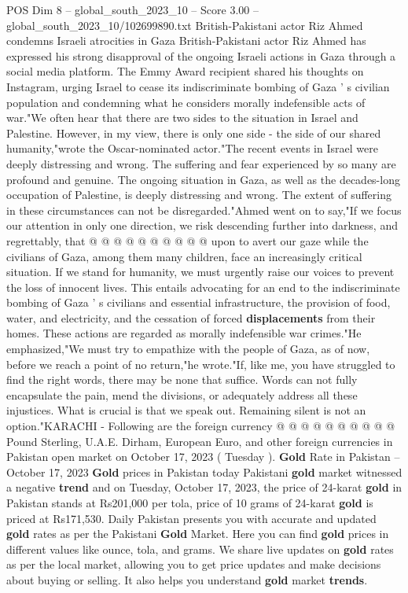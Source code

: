 \begin{textsample}{POS Dim 8 – global\_south\_2023\_10 – Score 3.00 – global\_south\_2023\_10/102699890.txt}  \label{ex:f8_pos_358}
British-Pakistani actor Riz Ahmed condemns Israeli atrocities in Gaza British-Pakistani actor Riz Ahmed has expressed his strong disapproval of the ongoing Israeli actions in Gaza through a social media platform.
The Emmy Award recipient shared his thoughts on Instagram, urging Israel to cease its indiscriminate bombing of Gaza ' s civilian population and condemning what he considers morally indefensible acts of war."We often hear that there are two sides to the situation in Israel and Palestine.
However, in my view, there is only one side - the side of our shared humanity,"wrote the Oscar-nominated actor."The recent events in Israel were deeply distressing and wrong.
The suffering and fear experienced by so many are profound and genuine.
The ongoing situation in Gaza, as well as the decades-long occupation of Palestine, is deeply distressing and wrong.
The extent of suffering in these circumstances can not be disregarded."Ahmed went on to say,"If we focus our attention in only one direction, we risk descending further into darkness, and regrettably, that @ @ @ @ @ @ @ @ @ @ upon to avert our gaze while the civilians of Gaza, among them many children, face an increasingly critical situation.
If we stand for humanity, we must urgently raise our voices to prevent the loss of innocent lives.
This entails advocating for an end to the indiscriminate bombing of Gaza ' s civilians and essential infrastructure, the provision of food, water, and electricity, and the cessation of forced \textbf{displacements} from their homes.
These actions are regarded as morally indefensible war crimes."He emphasized,"We must try to empathize with the people of Gaza, as of now, before we reach a point of no return,"he wrote."If, like me, you have struggled to find the right words, there may be none that suffice.
Words can not fully encapsulate the pain, mend the divisions, or adequately address all these injustices.
What is crucial is that we speak out.
Remaining silent is not an option."KARACHI - Following are the foreign currency @ @ @ @ @ @ @ @ @ @ Pound Sterling, U.A.E.
Dirham, European Euro, and other foreign currencies in Pakistan open market on October 17, 2023 ( Tuesday ). \textbf{Gold} Rate in Pakistan -- October 17, 2023 \textbf{Gold} prices in Pakistan today Pakistani \textbf{gold} market witnessed a negative \textbf{trend} and on Tuesday, October 17, 2023, the price of 24-karat \textbf{gold} in Pakistan stands at Rs201,000 per tola, price of 10 grams of 24-karat \textbf{gold} is priced at Rs171,530.
Daily Pakistan presents you with accurate and updated \textbf{gold} rates as per the Pakistani \textbf{Gold} Market.
Here you can find \textbf{gold} prices in different values like ounce, tola, and grams.
We share live updates on \textbf{gold} rates as per the local market, allowing you to get price updates and make decisions about buying or selling.
It also helps you understand \textbf{gold} market \textbf{trends}.

\end{textsample}
